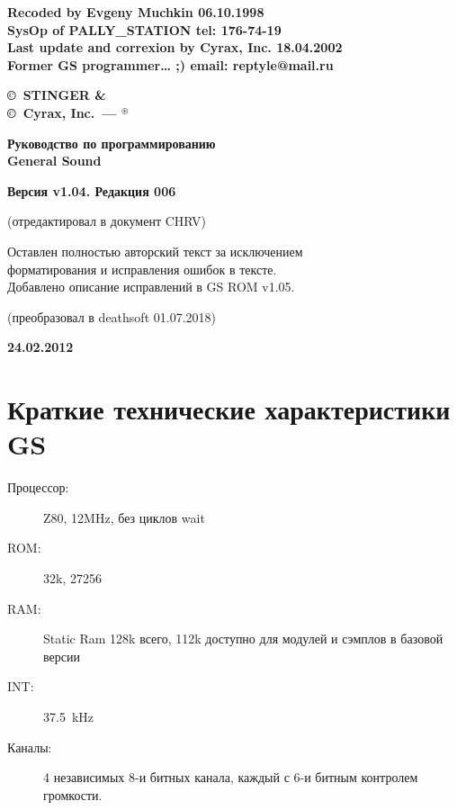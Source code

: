 \documentclass[a4paper,11pt]{article}
\DeclareRobustCommand{\Cyrax}{\texorpdfstring{\(^\circledast\)}{\circledast}}
\begin{document}
\begin{titlepage}
\begin{center}

\textbf{Recoded by Evgeny Muchkin 06.10.1998\\
 SysOp of PALLY\_STATION  tel: 176-74-19\\
Last update and correxion by Cyrax, Inc. 18.04.2002\\
Former GS programmer\ldots{} ;) email: reptyle@mail.ru}
 \vfill

\textbf{\LARGE\copyright~STINGER \&\\
\copyright~Cyrax, Inc.~--- \Cyrax\label{Cyrax}}

 \medskip
 \medskip

\textbf{\LARGE{}Руководство по программированию\\
General Sound}

 \medskip
 \medskip

\textbf{\Large{}Версия v1.04. Редакция 006}

 \vfill

(отредактировал в документ CHRV)

 \medskip

Оставлен полностью авторский текст за исключением \\
форматирования и исправления ошибок в тексте.\\
Добавлено описание исправлений в GS ROM v1.05.

 \medskip

(преобразовал в \XeLaTeX{} deathsoft 01.07.2018)

 \medskip

\textbf{24.02.2012}
\end{center}
\end{titlepage}

\newpage

\tableofcontents 

\newpage

\section{Краткие технические характеристики GS}
\begin{description}
\item[Процессор:] Z80, 12MHz, без циклов wait
\item[ROM:] 32k, 27256
\item[RAM:] Static Ram 128k всего, 112k  доступно для модулей и сэмплов в  базовой версии
\item[INT:] 37.5~kHz
\item[Каналы:] 4 независимых 8-и битных канала,  каждый с 6-и битным контролем громкости.
\end{description}
\end{document}
